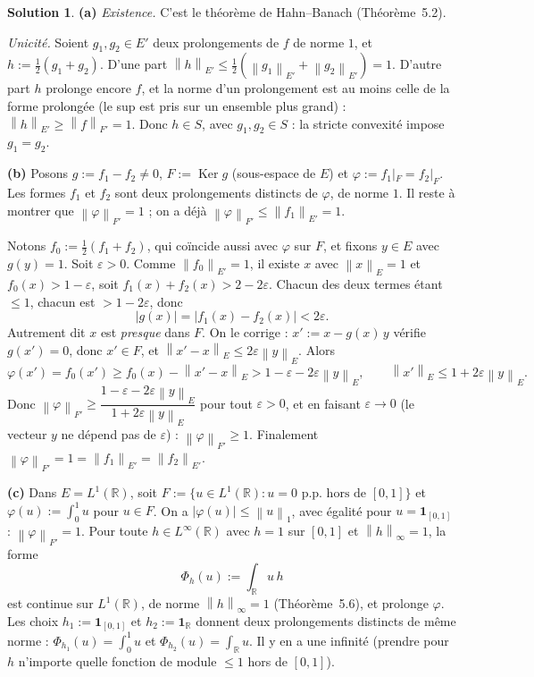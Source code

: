 \documentclass[11pt,a4paper]{article}
\newcommand{\R}{\mathbb{R}}
\newcommand{\norm}[1]{\left\|#1\right\|}
\DeclareMathOperator{\Ker}{Ker}
\theoremstyle{definition}
\newtheorem*{solution}{Solution}
\begin{document}
\begin{solution}
\noindent\textbf{(a)} \emph{Existence.} C'est le théorème de Hahn--Banach (Théorème~5.2).

\emph{Unicité.} Soient $g_1,g_2\in E'$ deux prolongements de $f$ de norme $1$, et $h:=\frac12(g_1+g_2)$. D'une part $\norm h_{E'}\le\frac12(\norm{g_1}_{E'}+\norm{g_2}_{E'})=1$. D'autre part $h$ prolonge encore $f$, et la norme d'un prolongement est au moins celle de la forme prolongée (le sup est pris sur un ensemble plus grand) : $\norm h_{E'}\ge\norm f_{F'}=1$. Donc $h\in S$, avec $g_1,g_2\in S$ : la stricte convexité impose $g_1=g_2$.

\medskip
\noindent\textbf{(b)} Posons $g:=f_1-f_2\ne0$, $F:=\Ker g$ (sous-espace de $E$) et $\varphi:=f_1|_F=f_2|_F$. Les formes $f_1$ et $f_2$ sont deux prolongements distincts de $\varphi$, de norme $1$. Il reste à montrer que $\norm\varphi_{F'}=1$ ; on a déjà $\norm\varphi_{F'}\le\norm{f_1}_{E'}=1$.

Notons $f_0:=\frac12(f_1+f_2)$, qui coïncide aussi avec $\varphi$ sur $F$, et fixons $y\in E$ avec $g(y)=1$. Soit $\varepsilon>0$. Comme $\norm{f_0}_{E'}=1$, il existe $x$ avec $\norm x_E=1$ et $f_0(x)>1-\varepsilon$, soit $f_1(x)+f_2(x)>2-2\varepsilon$. Chacun des deux termes étant $\le1$, chacun est $>1-2\varepsilon$, donc
\[
|g(x)|=|f_1(x)-f_2(x)|<2\varepsilon .
\]
Autrement dit $x$ est \emph{presque} dans $F$. On le corrige : $x':=x-g(x)\,y$ vérifie $g(x')=0$, donc $x'\in F$, et $\norm{x'-x}_E\le2\varepsilon\norm y_E$. Alors
\[
\varphi(x')=f_0(x')\ge f_0(x)-\norm{x'-x}_E>1-\varepsilon-2\varepsilon\norm y_E,\qquad\norm{x'}_E\le1+2\varepsilon\norm y_E .
\]
Donc $\norm\varphi_{F'}\ge\dfrac{1-\varepsilon-2\varepsilon\norm y_E}{1+2\varepsilon\norm y_E}$ pour tout $\varepsilon>0$, et en faisant $\varepsilon\to0$ (le vecteur $y$ ne dépend pas de $\varepsilon$) : $\norm\varphi_{F'}\ge1$. Finalement $\norm\varphi_{F'}=1=\norm{f_1}_{E'}=\norm{f_2}_{E'}$.

\medskip
\noindent\textbf{(c)} Dans $E=L^1(\R)$, soit $F:=\{u\in L^1(\R):u=0\text{ p.p. hors de }[0,1]\}$ et $\varphi(u):=\int_0^1u$ pour $u\in F$. On a $|\varphi(u)|\le\norm u_1$, avec égalité pour $u=\mathbf 1_{[0,1]}$ : $\norm\varphi_{F'}=1$. Pour toute $h\in L^\infty(\R)$ avec $h=1$ sur $[0,1]$ et $\norm h_\infty=1$, la forme
\[
\Phi_h(u):=\int_\R u\,h
\]
est continue sur $L^1(\R)$, de norme $\norm h_\infty=1$ (Théorème~5.6), et prolonge $\varphi$. Les choix $h_1:=\mathbf 1_{[0,1]}$ et $h_2:=\mathbf 1_\R$ donnent deux prolongements distincts de même norme : $\Phi_{h_1}(u)=\int_0^1u$ et $\Phi_{h_2}(u)=\int_\R u$. Il y en a une infinité (prendre pour $h$ n'importe quelle fonction de module $\le1$ hors de $[0,1]$).
\end{solution}
\end{document}
